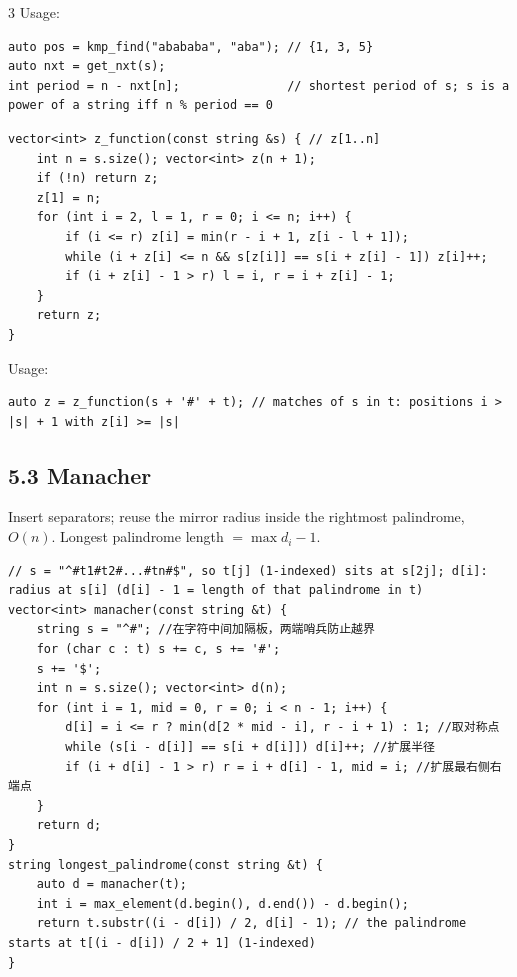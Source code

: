 \documentclass[8pt]{extarticle}
\begin{document}
\begin{multicols*}{3}
Usage:

\begin{lstlisting}
auto pos = kmp_find("abababa", "aba"); // {1, 3, 5}
auto nxt = get_nxt(s);
int period = n - nxt[n];               // shortest period of s; s is a power of a string iff n % period == 0
\end{lstlisting}

\begin{lstlisting}
vector<int> z_function(const string &s) { // z[1..n]
    int n = s.size(); vector<int> z(n + 1);
    if (!n) return z;
    z[1] = n;
    for (int i = 2, l = 1, r = 0; i <= n; i++) {
        if (i <= r) z[i] = min(r - i + 1, z[i - l + 1]);
        while (i + z[i] <= n && s[z[i]] == s[i + z[i] - 1]) z[i]++;
        if (i + z[i] - 1 > r) l = i, r = i + z[i] - 1;
    }
    return z;
}
\end{lstlisting}

Usage:

\begin{lstlisting}
auto z = z_function(s + '#' + t); // matches of s in t: positions i > |s| + 1 with z[i] >= |s|
\end{lstlisting}

\subsection*{5.3 Manacher}

Insert separators; reuse the mirror radius inside the rightmost palindrome, $O(n)$. Longest palindrome length $= \max d_i - 1$.

\begin{lstlisting}
// s = "^#t1#t2#...#tn#$", so t[j] (1-indexed) sits at s[2j]; d[i]: radius at s[i] (d[i] - 1 = length of that palindrome in t)
vector<int> manacher(const string &t) {
    string s = "^#"; //在字符中间加隔板，两端哨兵防止越界
    for (char c : t) s += c, s += '#';
    s += '$';
    int n = s.size(); vector<int> d(n);
    for (int i = 1, mid = 0, r = 0; i < n - 1; i++) {
        d[i] = i <= r ? min(d[2 * mid - i], r - i + 1) : 1; //取对称点
        while (s[i - d[i]] == s[i + d[i]]) d[i]++; //扩展半径
        if (i + d[i] - 1 > r) r = i + d[i] - 1, mid = i; //扩展最右侧右端点
    }
    return d;
}
string longest_palindrome(const string &t) {
    auto d = manacher(t);
    int i = max_element(d.begin(), d.end()) - d.begin();
    return t.substr((i - d[i]) / 2, d[i] - 1); // the palindrome starts at t[(i - d[i]) / 2 + 1] (1-indexed)
}
\end{lstlisting}


\end{multicols*}
\end{document}
